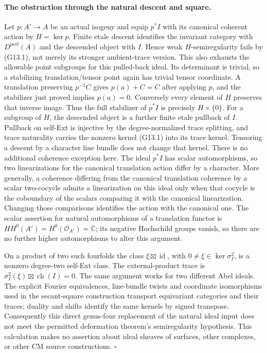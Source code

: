 \paragraph{The obstruction through the natural descent and square.}
Let $p:A'\to A$ be an actual isogeny and equip $p^*I$ with its
canonical coherent action by $H=\ker p$. Finite etale descent
identifies the invariant category with $D^{\mathrm{perf}}(A)$
and the descended object with $I$. Hence weak $H$-semiregularity
fails by (G13.1), not merely its stronger ambient-trace version.
This also exhausts the allowable point subgroups for this
pulled-back ideal. Its determinant is trivial, so a stabilizing
translation/tensor point again has trivial tensor coordinate.
A translation preserving $p^{-1}C$ gives $p(a)+C=C$ after
applying $p$, and the stabilizer just proved implies $p(a)=0$.
Conversely every element of $H$ preserves that inverse image.
Thus the full stabilizer of $p^*I$ is precisely $H\times\{0\}$.
For a subgroup of $H$, the descended object is a further finite
etale pullback of $I$. Pullback on self-Ext is injective by the
degree-normalized trace splitting, and trace naturality carries
the nonzero kernel (G13.1) into its trace kernel. Tensoring a
descent by a character line bundle does not change that kernel.
There is no additional coherence exception here. The ideal
$p^*I$ has scalar automorphisms, so two linearizations for the
canonical translation action differ by a character. More
generally, a coherence differing from the canonical translation
coherence by a scalar two-cocycle admits a linearization on this
ideal only when that cocycle is the coboundary of the scalars
comparing it with the canonical linearization. Changing those
comparisons identifies the action with the canonical one.
The scalar assertion for natural automorphisms of a translation
functor is $HH^0(A')=H^0(\mathcal O_{A'})=\mathbb C$; its negative
Hochschild groups vanish, so there are no further higher
automorphisms to alter this argument.

On a product of two such fourfolds the class
$\xi\boxtimes\operatorname{id}$, with $0\ne\xi\in\ker\sigma_I^2$,
is a nonzero degree-two self-Ext class. The external-product
trace is
$\sigma_I^2(\xi)\boxtimes\operatorname{ch}(I)=0$.
The same argument works for two different Abel ideals.
The explicit Fourier equivalences, line-bundle twists and
coordinate isomorphisms used in the secant-square construction
transport equivariant categories and their traces; duality and
shifts identify the same kernels by signed transpose.
Consequently this direct genus-four replacement of the natural
ideal input does not meet the permitted deformation theorem's
semiregularity hypothesis. This calculation makes no assertion
about ideal sheaves of surfaces, other complexes, or other CM
source constructions.
\hfill$\square$

